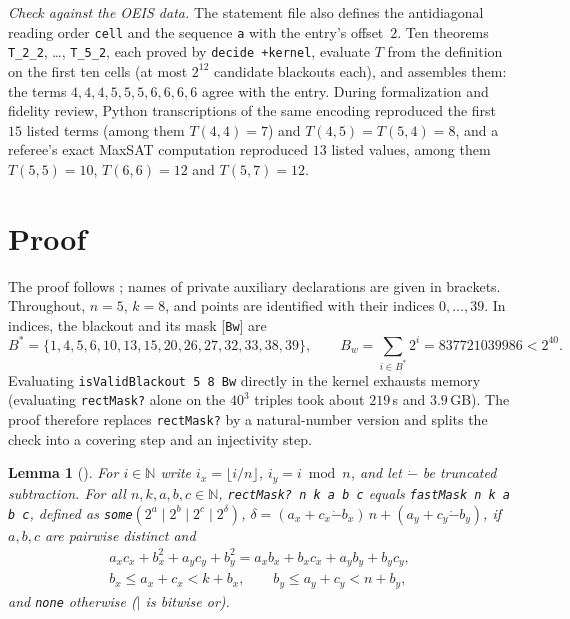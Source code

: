 \documentclass[11pt]{amsart}
\theoremstyle{plain}
\newtheorem{lemma}[theorem]{Lemma}
\theoremstyle{definition}
\newcommand{\N}{\mathbb{N}}
\newcommand{\Bs}{B^{*}}
\begin{document}
\emph{Check against the OEIS data.} The statement file also defines the antidiagonal reading order \texttt{cell} and the sequence \texttt{a} with the entry's offset~$2$. Ten theorems \texttt{T\_2\_2}, \dots, \texttt{T\_5\_2}, each proved by \texttt{decide +kernel}, evaluate $T$ from the definition on the first ten cells (at most $2^{12}$ candidate blackouts each), and  assembles them: the terms $4,4,4,5,5,5,6,6,6,6$ agree with the entry. During formalization and fidelity review, Python transcriptions of the same encoding reproduced the first $15$ listed terms (among them $T(4,4)=7$) and $T(4,5)=T(5,4)=8$, and a referee's exact MaxSAT computation reproduced $13$ listed values, among them $T(5,5)=10$, $T(6,6)=12$ and $T(5,7)=12$.

\section{Proof}\label{sec:proof}

The proof follows ; names of private auxiliary declarations are given in brackets. Throughout, $n=5$, $k=8$, and points are identified with their indices $0,\dots,39$. In indices, the blackout and its mask [\texttt{Bw}] are
\[
  \Bs=\{1,4,5,6,10,13,15,20,26,27,32,33,38,39\},\qquad B_w=\textstyle\sum_{i\in\Bs}2^i=837721039986<2^{40}.
\]
Evaluating \texttt{isValidBlackout 5 8 Bw} directly in the kernel exhausts memory (evaluating \texttt{rectMask?} alone on the $40^3$ triples took about $219$\,s and $3.9$\,GB). The proof therefore replaces \texttt{rectMask?} by a natural-number version and splits the check into a covering step and an injectivity step.

\begin{lemma}[]\label{lem:fast}
For $i\in\N$ write $i_x=\lfloor i/n\rfloor$, $i_y=i\bmod n$, and let $\dot-$ be truncated subtraction. For all $n,k,a,b,c\in\N$, \texttt{rectMask?\ n k a b c} equals \texttt{fastMask n k a b c}, defined as \texttt{some}$(2^a\mid 2^b\mid 2^c\mid 2^{\delta})$, $\delta=(a_x+c_x\dot-b_x)\,n+(a_y+c_y\dot-b_y)$, if $a,b,c$ are pairwise distinct and
\begin{gather}
  a_xc_x+b_x^2+a_yc_y+b_y^2=a_xb_x+b_xc_x+a_yb_y+b_yc_y,\label{eq:dot}\\
  b_x\le a_x+c_x<k+b_x,\qquad b_y\le a_y+c_y<n+b_y,\label{eq:grid}
\end{gather}
and \texttt{none} otherwise ($\mid$ is bitwise or).
\end{lemma}
\end{document}
